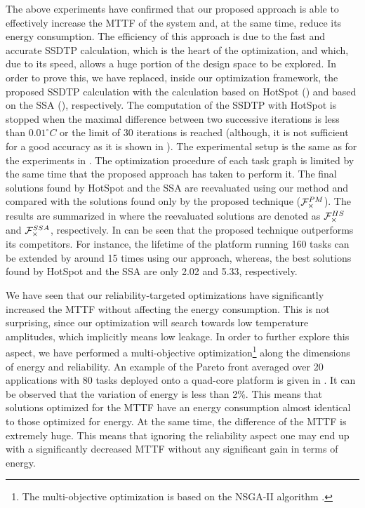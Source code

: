 The above experiments have confirmed that our proposed approach is able to effectively increase the MTTF of the system and, at the same time, reduce its energy consumption. The efficiency of this approach is due to the fast and accurate SSDTP calculation, which is the heart of the optimization, and which, due to its speed, allows a huge portion of the design space to be explored. In order to prove this, we have replaced, inside our optimization framework, the proposed SSDTP calculation with the calculation based on HotSpot () and based on the SSA (), respectively. The computation of the SSDTP with HotSpot is stopped when the maximal difference between two successive iterations is less than $0.01^\circ C$ or the limit of 30 iterations is reached (although, it is not sufficient for a good accuracy as it is shown in ). The experimental setup is the same as for the experiments in . The optimization procedure of each task graph is limited by the same time that the proposed approach has taken to perform it. The final solutions found by HotSpot and the SSA are reevaluated using our method and compared with the solutions found only by the proposed technique ($\mathcal{F}_{\times}^{PM}$). The results are summarized in  where the reevaluated solutions are denoted as $\mathcal{F}_{\times}^{HS}$ and $\mathcal{F}_{\times}^{SSA}$, respectively. In can be seen that the proposed technique outperforms its competitors. For instance, the lifetime of the platform running 160 tasks can be extended by around 15 times using our approach, whereas, the best solutions found by HotSpot and the SSA are only 2.02 and 5.33, respectively.

We have seen that our reliability-targeted optimizations have significantly increased the MTTF without affecting the energy consumption. This is not surprising, since our optimization will search towards low temperature amplitudes, which implicitly means low leakage. In order to further explore this aspect, we have performed a multi-objective optimization\footnote{The multi-objective optimization is based on the NSGA-II algorithm \cite{deb2002}.} along the dimensions of energy and reliability. An example of the Pareto front averaged over 20 applications with 80 tasks deployed onto a quad-core platform is given in . It can be observed that the variation of energy is less than 2\%. This means that solutions optimized for the MTTF have an energy consumption almost identical to those optimized for energy. At the same time, the difference of the MTTF is extremely huge. This means that ignoring the reliability aspect one may end up with a significantly decreased MTTF without any significant gain in terms of energy.


